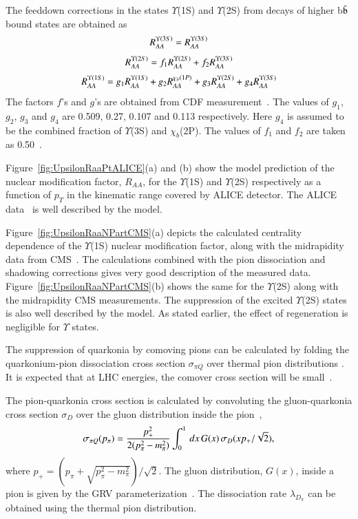 {The feeddown corrections in the states $\Upsilon$(1S) and $\Upsilon$(2S) 
from decays of higher b$\bar{\rm b}$ bound states are obtained as
  \begin{equation}
    R_{AA}^{\Upsilon(3S)} = R_{AA}^{\Upsilon(3S)}\\ %
  \end{equation}
  \begin{equation}
    R_{AA}^{\Upsilon(2S)} = f_1 R_{AA}^{\Upsilon(2S)} +  f_2 R_{AA}^{\Upsilon(3S)} \\ %
  \end{equation}
   \begin{equation}
    R_{AA}^{\Upsilon(1S)} = g_1 R_{AA}^{\Upsilon(1S)} +  g_2 R_{AA}^{\chi_b(1P)} + g_3 R_{AA}^{\Upsilon(2S)} + g_4 R_{AA}^{\Upsilon(3S)}\\ %
  \end{equation}
The factors $f$'s and $g$'s are obtained from CDF measurement~\cite{Affolder:1999wm}.
The values of $g_1$, $g_2$, $g_3$ and $g_4$ are 0.509, 0.27, 0.107
and 0.113 respectively. Here $g_4$ is assumed to be the combined fraction of 
$\Upsilon$(3S) and $\chi_b$(2P).
The values of $f_1$ and $f_2$ are taken as 0.50~\cite{Strickland:2011aa}.


Figure~\ref{fig:UpsilonRaaPtALICE}(a) and (b) show the model 
prediction \cite{Kumar:2019xdj} of the nuclear modification factor, $R_{AA}$, for the $\Upsilon$(1S)
and $\Upsilon$(2S) respectively as a function of $p_T$ in the kinematic range
covered by ALICE detector. The ALICE data~\cite{ALICE:2020wwx} is well described by the model.

Figure~\ref{fig:UpsilonRaaNPartCMS}(a) depicts the calculated \cite{Kumar:2019xdj}
centrality dependence of the $\Upsilon$(1S) nuclear
modification factor, along with the midrapidity data from CMS~\cite{Sirunyan:2018nsz}.
The calculations combined with the pion dissociation and shadowing corrections 
gives very good description of the measured data. Figure~\ref{fig:UpsilonRaaNPartCMS}(b)
shows the same for the $\Upsilon$(2S) along with the midrapidity
CMS measurements. The suppression of the excited $\Upsilon$(2S) states 
is also well described by the model. As stated earlier, the effect of regeneration is
negligible for $\Upsilon$ states. 


  The suppression of quarkonia by comoving pions can be calculated by folding the quarkonium-pion
dissociation cross section $\sigma_{\pi Q}$ over thermal pion distributions \cite{Vogt:1988fj}. 
It is expected  that at LHC energies, the comover cross section will be small~\cite{Lourenco:2008sk}.
{\color{black}
The pion-quarkonia cross section is calculated by convoluting the gluon-quarkonia cross section $\sigma_D$
over the gluon distribution inside the pion~\cite{Arleo:2001mp},
\begin{equation}
\sigma_{\pi Q} (p_{\pi}) = {p_+^2 \over 2(p_\pi^2 - m_\pi^2)} \int_0^1 \, dx \, G(x) \, \sigma_D(xp_+/\sqrt {2}),
\end{equation}
where $p_+ = (p_\pi + \sqrt{p_\pi^2-m_\pi^2})/\sqrt{2}$. The gluon distribution, $G(x)$, inside a pion is 
given by the GRV parameterization~\cite{Gluck:1991ey}. 
The dissociation rate $\lambda_{D_{\pi}}$  can be obtained using the 
thermal pion distribution.


}}
